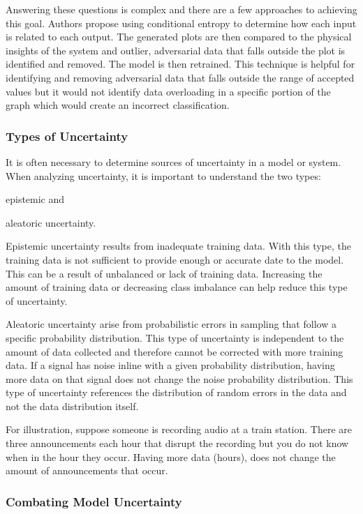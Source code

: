 Answering these questions is complex and there are a few approaches to achieving this goal. Authors \cite{black-box-explainability} propose using conditional entropy to determine how each input is related to each output. The generated plots are then compared to the physical insights of the system and outlier, adversarial data that falls outside the plot is identified and removed. The model is then retrained. This technique is helpful for identifying and removing adversarial data that falls outside the range of accepted values but it would not identify data overloading in a specific portion of the graph which would create an incorrect classification.

\subsubsection{Types of Uncertainty}
It is often necessary to determine sources of uncertainty in a model or system. When analyzing uncertainty, it is important to understand the two types:
\begin{inlinelist}
    \item epistemic and
    \item aleatoric uncertainty.
\end{inlinelist}

Epistemic uncertainty results from inadequate training data. With this type, the training data is not sufficient to provide enough or accurate date to the model. This can be a result of unbalanced or lack of training data. Increasing the amount of training data or decreasing class imbalance can help reduce this type of uncertainty.

Aleatoric uncertainty arise from probabilistic errors in sampling that follow a specific probability distribution. This type of uncertainty is independent to the amount of data collected and therefore cannot be corrected with more training data. If a signal has noise inline with a given probability distribution, having more data on that signal does not change the noise probability distribution. This type of uncertainty references the distribution of random errors in the data and not the data distribution itself.

For illustration, suppose someone is recording audio at a train station. There are three announcements each hour that disrupt the recording but you do not know when in the hour they occur. Having more data (hours), does not change the amount of announcements that occur.

\subsubsection{Combating Model Uncertainty}

